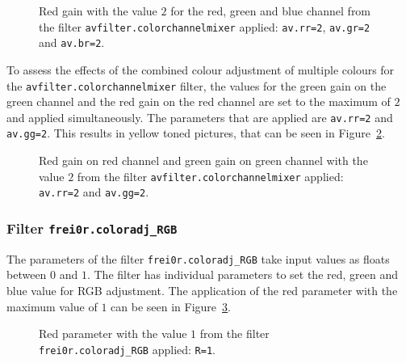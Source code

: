 \documentclass[../MasterThesis.tex]{subfiles}
\begin{document}
\begin{figure}[H]
	\begin{center}
		\caption[Red gain set to $2$ with \texttt{avfilter.colorchannelmixer}.]{Red gain with the value $2$ for the red, green and blue channel from the filter \texttt{avfilter.colorchannelmixer} applied: \texttt{av.rr=2}, \texttt{av.gr=2} and \texttt{av.br=2}.}
		\label{figure:rrbrgr}
	\end{center}
\end{figure}

To assess the effects of the combined colour adjustment of multiple colours for the \texttt{avfilter.colorchannelmixer} filter, the values for the green gain on the green channel and the red gain on the red channel are set to the maximum of $2$ and applied simultaneously. 
The parameters that are applied are \texttt{av.rr=2} and \texttt{av.gg=2}.
This results in yellow toned pictures, that can be seen in Figure~\ref{figure:rrgg}.


\begin{figure}[H]
	\begin{center}
		\caption[Red and green gain set to $2$ with \texttt{avfilter.colorchannelmixer}.]{Red gain on red channel and green gain on green channel with the value $2$ from the filter \texttt{avfilter.colorchannelmixer} applied: \texttt{av.rr=2} and \texttt{av.gg=2}.}
		\label{figure:rrgg}
	\end{center}
\end{figure}







\subsubsection*{Filter \texttt{frei0r.coloradj\_RGB}}

The parameters of the filter \texttt{frei0r.coloradj\_RGB} take input values as floats between $0$ and $1$. The filter has individual parameters to set the red, green and blue value for RGB adjustment. The application of the red parameter with the maximum value of $1$ can be seen in Figure~\ref{figure:r}.


\begin{figure}[H]
	\begin{center}
		\caption[Red parameter set to $1$ with \texttt{frei0r.coloradj\_RGB}.]{Red parameter with the value $1$ from the filter \texttt{frei0r.coloradj\_RGB} applied: \texttt{R=1}.}
		\label{figure:r}
	\end{center}
\end{figure}
\end{document}
